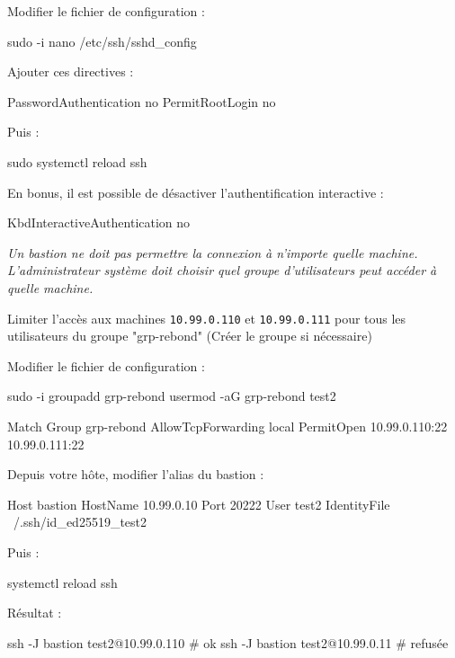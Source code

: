 \documentclass[a4paper,10pt]{exam}
\begin{document}
\begin{questions}
\begin{solution}
Modifier le fichier de configuration :

\begin{bashcode}
sudo -i
nano /etc/ssh/sshd_config
\end{bashcode}

Ajouter ces directives :

\begin{bashcode}
PasswordAuthentication no
PermitRootLogin no
\end{bashcode}

Puis : 

\begin{bashcode}
sudo systemctl reload ssh
\end{bashcode}

En bonus, il est possible de désactiver
l'authentification interactive :

\begin{bashcode}
KbdInteractiveAuthentication no
\end{bashcode}
\end{solution}

\question \emph{Un bastion ne doit pas permettre la connexion à
n'importe quelle machine.
L'administrateur système doit choisir quel groupe
d'utilisateurs peut accéder à quelle machine.}

  Limiter l'accès aux machines \texttt{10.99.0.110} et
  \texttt{10.99.0.111} pour tous les utilisateurs du groupe
  "grp-rebond" (Créer le groupe si nécessaire)

\begin{solution}
Modifier le fichier de configuration :

\begin{bashcode}
sudo -i
groupadd grp-rebond
usermod -aG grp-rebond test2
\end{bashcode}

\begin{bashcode}
Match Group grp-rebond
    AllowTcpForwarding local
    PermitOpen 10.99.0.110:22 10.99.0.111:22
\end{bashcode}

Depuis votre hôte, modifier l'alias du bastion :

\begin{bashcode}
  Host bastion
      HostName 10.99.0.10
      Port 20222
      User test2
      IdentityFile ~/.ssh/id_ed25519_test2
\end{bashcode}

Puis :

\begin{bashcode}
systemctl reload ssh
\end{bashcode}

Résultat :

\begin{bashcode}
ssh -J bastion test2@10.99.0.110   # ok
ssh -J bastion test2@10.99.0.11 # refusée
\end{bashcode}
\end{solution}
\end{questions}
\end{document}
